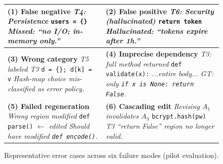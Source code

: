 \documentclass[sigconf,review,anonymous]{acmart}
\begin{document}
\begin{figure}[t]
  \centering
  \footnotesize
  \renewcommand{\arraystretch}{1.1}
  \setlength{\tabcolsep}{4pt}
  \begin{tabular}{|p{}|p{}|}
    \hline
    \textbf{(1) False negative} \newline
    \textit{T4: Persistence} \newline
    \texttt{users = \{\}} \newline
    \textit{Missed: ``no I/O; in-memory only.''} &
    \textbf{(2) False positive} \newline
    \textit{T6: Security (hallucinated)} \newline
    \texttt{return token} \newline
    \textit{Hallucinated: ``tokens expire after 1h.''} \\
    \hline
    \textbf{(3) Wrong category} \newline
    \textit{T5 labeled T3} \newline
    \texttt{d = \{\}; d[k] = v} \newline
    \textit{Hash-map choice mis-classified as error policy.} &
    \textbf{(4) Imprecise dependency} \newline
    \textit{T3: full method returned} \newline
    \texttt{def validate(x):} \textit{...entire body...} \newline
    \textit{GT: only \texttt{if x is None: return False}.} \\
    \hline
    \textbf{(5) Failed regeneration} \newline
    \textit{Wrong region modified} \newline
    \texttt{def parse()} \textit{ $\leftarrow$ edited} \newline
    \textit{Should have modified \texttt{def encode()}.} &
    \textbf{(6) Cascading edit} \newline
    \textit{Revising $A_1$ invalidates $A_3$} \newline
    \texttt{bcrypt.hash(pw)} \newline
    \textit{T3 ``return False'' region no longer valid.} \\
    \hline
  \end{tabular}
  \caption{Representative error cases across six failure modes (pilot evaluation).}
  \label{fig:erroranalysis}
\end{figure}
\end{document}
